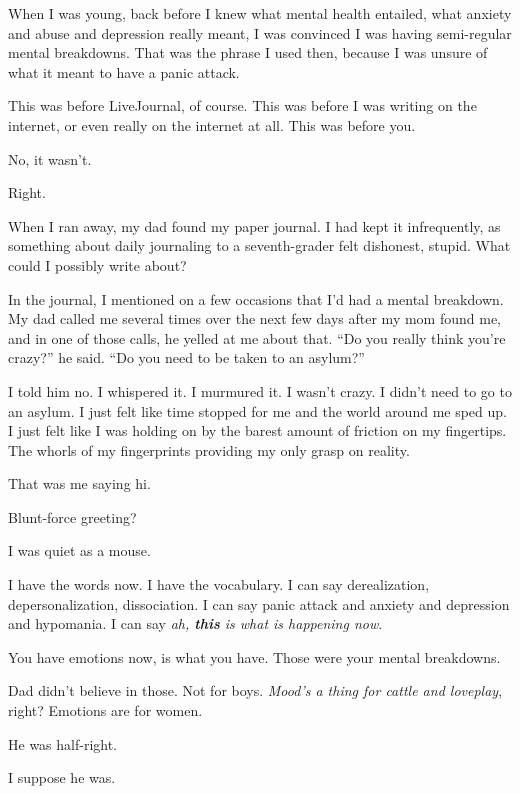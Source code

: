 When I was young, back before I knew what mental health entailed, what anxiety and abuse and depression really meant, I was convinced I was having semi-regular mental breakdowns. That was the phrase I used then, because I was unsure of what it meant to have a panic attack.

This was before LiveJournal, of course. This was before I was writing on the internet, or even really on the internet at all. This was before you.

\begin{ally}
No, it wasn't.
\end{ally}
Right.

When I ran away, my dad found my paper journal. I had kept it infrequently, as something about daily journaling to a seventh-grader felt dishonest, stupid. What could I possibly write about?

In the journal, I mentioned on a few occasions that I'd had a mental breakdown. My dad called me several times over the next few days after my mom found me, and in one of those calls, he yelled at me about that. ``Do you really think you're crazy?'' he said. ``Do you need to be taken to an asylum?''

I told him no. I whispered it. I murmured it. I wasn't crazy. I didn't need to go to an asylum. I just felt like time stopped for me and the world around me sped up. I just felt like I was holding on by the barest amount of friction on my fingertips. The whorls of my fingerprints providing my only grasp on reality.

\begin{ally}
That was me saying hi.
\end{ally}
Blunt-force greeting?

\begin{ally}
I was quiet as a mouse.
\end{ally}
I have the words now. I have the vocabulary. I can say derealization, depersonalization, dissociation. I can say panic attack and anxiety and depression and hypomania. I can say \emph{ah, \textbf{this} is what is happening now}.

\begin{ally}
You have emotions now, is what you have. Those were your mental breakdowns.
\end{ally}
Dad didn't believe in those. Not for boys. \emph{Mood's a thing for cattle and loveplay}, right? Emotions are for women.

\begin{ally}
He was half-right.
\end{ally}
I suppose he was.

\newpage
